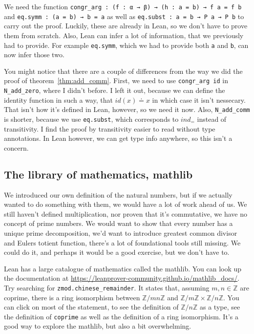 \documentclass[a4paper, 12pt]{article}
\newcommand{\Z}{\mathbb{Z}}
\newcommand{\lean}[1]{\texttt{#1}}
\theoremstyle{changedot}
\theoremstyle{changedotbreak}
\theoremstyle{nonumberplain}
\begin{document}
We need the function \texttt{congr_arg : (f : α → β) → (h : a = b) → f a = f b} and \texttt{eq.symm : (a = b) → b = a} as well as \texttt{eq.subst : a = b → P a → P b} to carry out the proof. Luckily, these are already in Lean, so we don't have to prove them from scratch. Also, Lean can infer a lot of information, that we previously had to provide. For example \texttt{eq.symm}, which we had to provide both \texttt{a} and \texttt{b}, can now infer those two.

You might notice that there are a couple of differences from the way we did the proof of theorem~\ref{thm:add_comm}. First, we need to use \texttt{congr_arg id} in \texttt{N_add_zero}, where I didn't before. I left it out, because we can define the identity function in such a way, that $id(x) \doteq x$ in which case it isn't nessecary. That isn't how it's defined in Lean, however, so we need it now. Also, \texttt{N_add_comm} is shorter, because we use \texttt{eq.subst}, which corresponds to $ind_{=}$ instead of transitivity. I find the proof by transitivity easier to read without type annotations. In Lean however, we can get type info anywhere, so this isn't a concern.


\subsection{The library of mathematics, mathlib}
We introduced our own definition of the natural numbers, but if we actually wanted to do something with them, we would have a lot of work ahead of us. We still haven't defined multiplication, nor proven that it's commutative, we have no concept of prime numbers. We would want to show that every number has a unique prime decomposition, we'd want to introduce greatest common divisor and Eulers totient function, there's a lot of foundational tools still missing. We could do it, and perhaps it would be a good exercise, but we don't have to.

Lean has a large catalogue of mathematics called the mathlib. You can look up the documentation at {\footnotesize \url{https://leanprover-community.github.io/mathlib_docs/}}. Try searching for \lean{zmod.chinese_remainder}. It states that, assuming $m, n \in \Z$ are coprime, there is a ring isomorphism between $\Z/mn\Z$ and $\Z/m\Z \times \Z/n\Z$. You can click on most of the statement, to see the definition of $\Z/n\Z$ as a type, see the definition of \lean{coprime} as well as the definition of a ring isomorphism. It's a good way to explore the mathlib, but also a bit overwhelming.
\end{document}
